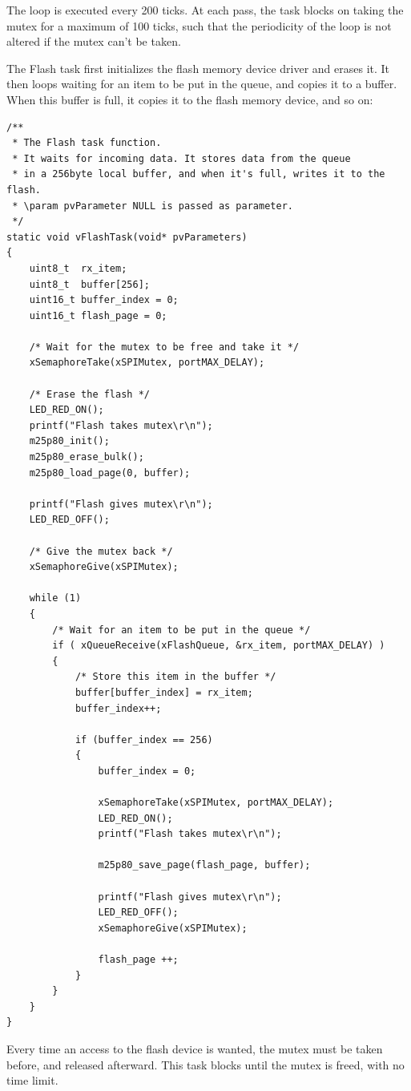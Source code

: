 \documentclass[11pt]{report}
\begin{document}
The loop is executed every 200 ticks. At each pass, the task blocks on taking the mutex for a maximum of 100 ticks, such that the periodicity of the loop is not altered if the mutex can't be taken.

The Flash task first initializes the flash memory device driver and erases it.
It then loops waiting for an item to be put in the queue, and copies it to a buffer. When this buffer is full, it copies it to the flash memory device, and so on:

\begin{verbatim}
/**
 * The Flash task function.
 * It waits for incoming data. It stores data from the queue
 * in a 256byte local buffer, and when it's full, writes it to the flash.
 * \param pvParameter NULL is passed as parameter.
 */
static void vFlashTask(void* pvParameters)
{
    uint8_t  rx_item;
    uint8_t  buffer[256];
    uint16_t buffer_index = 0;
    uint16_t flash_page = 0;

    /* Wait for the mutex to be free and take it */
    xSemaphoreTake(xSPIMutex, portMAX_DELAY);

    /* Erase the flash */
    LED_RED_ON();
    printf("Flash takes mutex\r\n");
    m25p80_init();
    m25p80_erase_bulk();
    m25p80_load_page(0, buffer);

    printf("Flash gives mutex\r\n");
    LED_RED_OFF();

    /* Give the mutex back */
    xSemaphoreGive(xSPIMutex);

    while (1)
    {
        /* Wait for an item to be put in the queue */
        if ( xQueueReceive(xFlashQueue, &rx_item, portMAX_DELAY) )
        {
            /* Store this item in the buffer */
            buffer[buffer_index] = rx_item;
            buffer_index++;

            if (buffer_index == 256)
            {
                buffer_index = 0;

                xSemaphoreTake(xSPIMutex, portMAX_DELAY);
                LED_RED_ON();
                printf("Flash takes mutex\r\n");

                m25p80_save_page(flash_page, buffer);

                printf("Flash gives mutex\r\n");
                LED_RED_OFF();
                xSemaphoreGive(xSPIMutex);

                flash_page ++;
            }
        }
    }
}
\end{verbatim}

Every time an access to the flash device is wanted, the mutex must be taken before, and released afterward. This task blocks until the mutex is freed, with no time limit.
\end{document}
